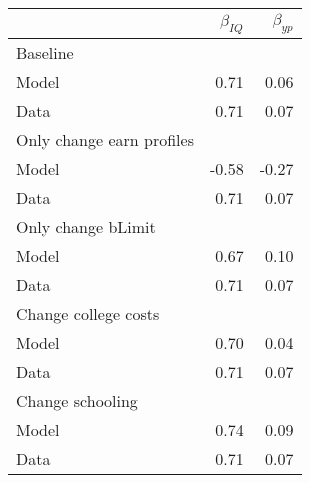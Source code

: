 \begin{tabular}{lrr}
\hline
  & $\beta_{IQ}$  & $\beta_{yp}$  \\
\hline
Baseline &   &   \\
Model & 0.71  & 0.06  \\
Data & 0.71  & 0.07  \\
Only change earn profiles &   &   \\
Model & -0.58  & -0.27  \\
Data & 0.71  & 0.07  \\
Only change bLimit &   &   \\
Model & 0.67  & 0.10  \\
Data & 0.71  & 0.07  \\
Change college costs &   &   \\
Model & 0.70  & 0.04  \\
Data & 0.71  & 0.07  \\
Change schooling &   &   \\
Model & 0.74  & 0.09  \\
Data & 0.71  & 0.07  \\
\hline
\end{tabular}%
